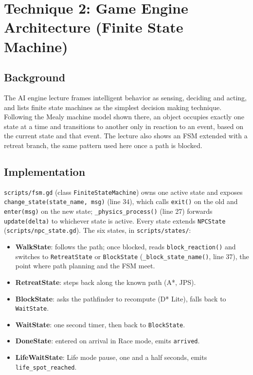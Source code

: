 \documentclass[11pt,a4paper]{article}
\begin{document}
\section{Technique 2: Game Engine Architecture (Finite State Machine)}

\subsection{Background}

The AI engine lecture frames intelligent behavior as sensing, deciding and acting, and lists finite state machines as the simplest decision making technique. Following the Mealy machine model shown there, an object occupies exactly one state at a time and transitions to another only in reaction to an event, based on the current state and that event. The lecture also shows an FSM extended with a retreat branch, the same pattern used here once a path is blocked.

\subsection{Implementation}

\texttt{scripts/fsm.gd} (class \texttt{FiniteStateMachine}) owns one active state and exposes \texttt{change\_state(state\_name, msg)} (line 34), which calls \texttt{exit()} on the old and \texttt{enter(msg)} on the new state; \texttt{\_physics\_process()} (line 27) forwards \texttt{update(delta)} to whichever state is active. Every state extends \texttt{NPCState} (\texttt{scripts/npc\_state.gd}). The six states, in \texttt{scripts/states/}:

\begin{itemize}[leftmargin=1.2em]
    \item \textbf{WalkState}: follows the path; once blocked, reads \texttt{block\_reaction()} and switches to \texttt{RetreatState} or \texttt{BlockState} (\texttt{\_block\_state\_name()}, line 37), the point where path planning and the FSM meet.
    \item \textbf{RetreatState}: steps back along the known path (A*, JPS).
    \item \textbf{BlockState}: asks the pathfinder to recompute (D* Lite), falls back to \texttt{WaitState}.
    \item \textbf{WaitState}: one second timer, then back to \texttt{BlockState}.
    \item \textbf{DoneState}: entered on arrival in Race mode, emits \texttt{arrived}.
    \item \textbf{LifeWaitState}: Life mode pause, one and a half seconds, emits \texttt{life\_spot\_reached}.
\end{itemize}
\end{document}
